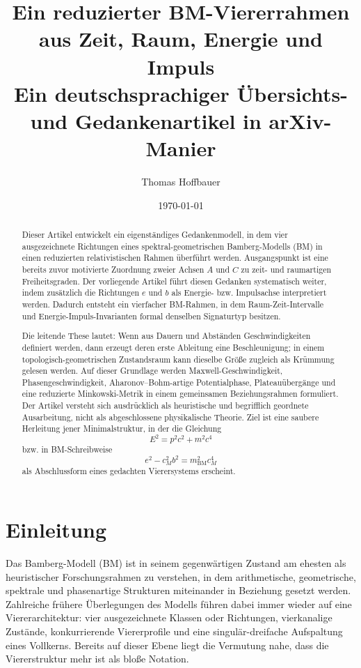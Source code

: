 \documentclass[11pt,a4paper]{article}
\title{Ein reduzierter BM-Viererrahmen aus Zeit, Raum, Energie und Impuls\\
	\large Ein deutschsprachiger Übersichts- und Gedankenartikel in arXiv-Manier}
\author{Thomas Hoffbauer}
\date{\today}
\theoremstyle{definition}
\theoremstyle{plain}
\begin{document}
	\maketitle
	
	\begin{abstract}
		Dieser Artikel entwickelt ein eigenständiges Gedankenmodell, in dem vier ausgezeichnete Richtungen eines spektral-geometrischen Bamberg-Modells (BM) in einen reduzierten relativistischen Rahmen überführt werden. Ausgangspunkt ist eine bereits zuvor motivierte Zuordnung zweier Achsen $A$ und $C$ zu zeit- und raumartigen Freiheitsgraden. Der vorliegende Artikel führt diesen Gedanken systematisch weiter, indem zusätzlich die Richtungen $e$ und $b$ als Energie- bzw. Impulsachse interpretiert werden. Dadurch entsteht ein vierfacher BM-Rahmen, in dem Raum-Zeit-Intervalle und Energie-Impuls-Invarianten formal denselben Signaturtyp besitzen.
		
		Die leitende These lautet: Wenn aus Dauern und Abständen Geschwindigkeiten definiert werden, dann erzeugt deren erste Ableitung eine Beschleunigung; in einem topologisch-geometrischen Zustandsraum kann dieselbe Größe zugleich als Krümmung gelesen werden. Auf dieser Grundlage werden Maxwell-Geschwindigkeit, Phasengeschwindigkeit, Aharonov--Bohm-artige Potentialphase, Plateauübergänge und eine reduzierte Minkowski-Metrik in einem gemeinsamen Beziehungsrahmen formuliert. Der Artikel versteht sich ausdrücklich als heuristische und begrifflich geordnete Ausarbeitung, nicht als abgeschlossene physikalische Theorie. Ziel ist eine saubere Herleitung jener Minimalstruktur, in der die Gleichung
		\[
		E^2 = p^2 c^2 + m^2 c^4
		\]
		bzw. in BM-Schreibweise
		\[
		e^2 - c_M^2 b^2 = m_{\mathrm{BM}}^2 c_M^4
		\]
		als Abschlussform eines gedachten Vierersystems erscheint.
	\end{abstract}
	
	\tableofcontents
	
	\section{Einleitung}
	
	Das Bamberg-Modell (BM) ist in seinem gegenwärtigen Zustand am ehesten als heuristischer Forschungsrahmen zu verstehen, in dem arithmetische, geometrische, spektrale und phasenartige Strukturen miteinander in Beziehung gesetzt werden. Zahlreiche frühere Überlegungen des Modells führen dabei immer wieder auf eine Viererarchitektur: vier ausgezeichnete Klassen oder Richtungen, vierkanalige Zustände, konkurrierende Viererprofile und eine singulär-dreifache Aufspaltung eines Vollkerns. Bereits auf dieser Ebene liegt die Vermutung nahe, dass die Viererstruktur mehr ist als bloße Notation.
	
\end{document}

